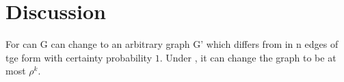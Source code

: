 \section{Discussion}
\begin{thm}For can G can change to an arbitrary graph G' which differs from in n edges of tge form with certainty probability $1$. Under , it can change the graph to be at most $\rho^k$. \end{thm}